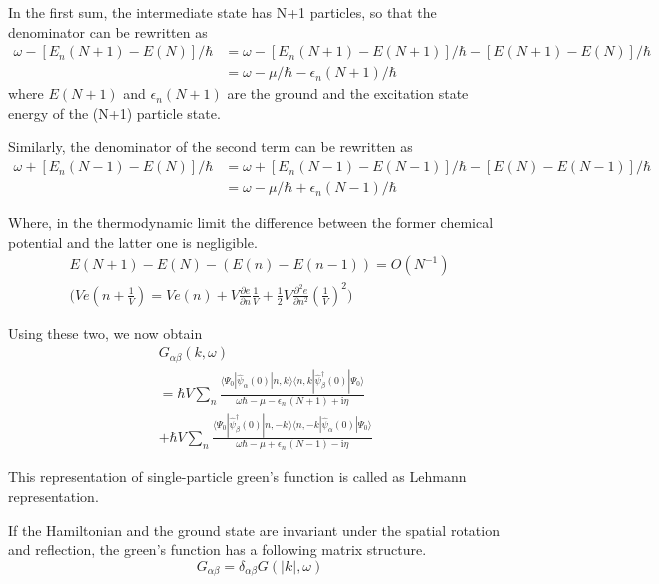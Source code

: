 In the first sum, the intermediate state has N+1 particles, so that the denominator can be rewritten as
\begin{align}
\omega-[E_n(N+1)-E(N)]/\hbar &= \omega-[E_n(N+1)-E(N+1)]/\hbar-[E(N+1)-E(N)]/\hbar \nonumber \\
&=\omega-\mu/\hbar-\epsilon_n(N+1)/\hbar \nonumber
\end{align}
where $E(N+1)$ and $\epsilon_n(N+1)$ are the ground and the excitation state energy of the (N+1) particle state.

Similarly, the denominator of the second term can be rewritten as 
\begin{align}
\omega+[E_n(N-1)-E(N)]/\hbar &= \omega+[E_n(N-1)-E(N-1)]/\hbar-[E(N)-E(N-1)]/\hbar \nonumber \\
&=\omega-\mu/\hbar+\epsilon_n(N-1)/\hbar \nonumber
\end{align}

Where, in the thermodynamic limit the difference between the former chemical potential and the latter one is negligible.
\begin{align}
E(N+1)-E(N)-(E(n)-E(n-1))=O(N^{-1}) \nonumber \\
\bigg ( Ve(n+\frac{1}{V}) = Ve(n)+ V\frac{\partial e}{\partial n}\frac{1}{V} + \frac{1}{2} V\frac{\partial^2 e}{\partial n^2} (\frac{1}{V})^2 \bigg) \nonumber
\end{align}

Using these two, we now obtain 
\begin{align}\label{2.3.12}
& G_{\alpha\beta}(k,\omega) \nonumber \\
&=\hbar V\sum_n \frac{\langle\Psi_0|\hat \psi_{\alpha}(0)|n,k\rangle\langle n,k|\hat \psi^{
\dagger}_{\beta} (0)|\Psi_0\rangle}{\omega\hbar-\mu-\epsilon_n(N+1)+\mathrm{i}\eta}  \nonumber \\
&+\hbar V\sum_n \frac{\langle\Psi_0|\hat \psi^{
\dagger}_{\beta} (0)|n,-k\rangle\langle n,-k|\hat \psi_{\alpha}(0)|\Psi_0\rangle}{\omega\hbar-\mu+\epsilon_n(N-1)-\mathrm{i}\eta} 
\end{align}

This representation of single-particle green's function is called as Lehmann representation.

If the Hamiltonian and the ground state are invariant under the spatial rotation and reflection, the green's function has a following matrix structure.
\begin{equation}
G_{\alpha\beta}=\delta_{\alpha\beta}G(|k|,\omega) \nonumber
\end{equation}

